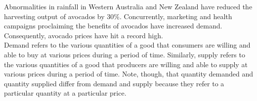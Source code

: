 \documentclass[12pt]{article}
\begin{document}

	Abnormalities in rainfall in Western Australia and New Zealand have reduced the harvesting output of avocados by 30\%. Concurrently, marketing and health campaigns proclaiming the benefits of avocados have increased demand. Consequently, avocado prices have hit a record high. \\
	
	Demand refers to the various quantities of a good that consumers are willing and able to buy at various prices during a period of time. Similarly, supply refers to the various quantities of a good that producers are willing and able to supply at various prices during a period of time. Note, though, that quantity demanded and quantity supplied differ from demand and supply because they refer to a particular quantity at a particular price. \\
	
\end{document}
